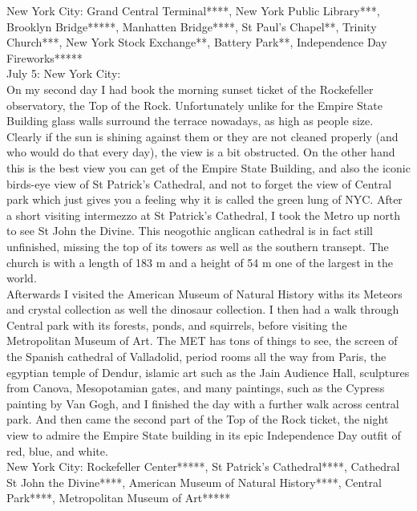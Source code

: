 New York City: Grand Central Terminal****, New York Public Library***, Brooklyn Bridge*****, Manhatten Bridge****, St Paul's Chapel**, Trinity Church***, New York Stock Exchange**, Battery Park**, Independence Day Fireworks*****\\

July 5: New York City:\\
On my second day I had book the morning sunset ticket of the Rockefeller observatory, the Top of the Rock. Unfortunately unlike for the Empire State Building glass walls surround the terrace nowadays, as high as people size. Clearly if the sun is shining against them or they are not cleaned properly (and who would do that every day), the view is a bit obstructed. On the other hand this is the best view you can get of the Empire State Building, and also the iconic birds-eye view of St Patrick's Cathedral, and not to forget the view of Central park which just gives you a feeling why it is called the green lung of NYC. After a short visiting intermezzo at St Patrick's Cathedral, I took the Metro up north to see St John the Divine. This neogothic anglican cathedral is in fact still unfinished, missing the top of its towers as well as the southern transept. The church is with a length of 183 m and a height of 54 m one of the largest in the world.\\
 Afterwards I visited the American Museum of Natural History withs its Meteors and crystal collection as well the dinosaur collection. I then had a walk through Central park with its forests, ponds, and squirrels, before visiting the Metropolitan Museum of Art. The MET has tons of things to see, the screen of the Spanish cathedral of Valladolid, period rooms all the way from Paris, the egyptian temple of Dendur, islamic art such as the Jain Audience Hall, sculptures from Canova, Mesopotamian gates, and many paintings, such as the Cypress painting by Van Gogh, and I finished the day with a further walk across central park. And then came the second part of the Top of the Rock ticket, the night view to admire the Empire State building in its epic Independence Day outfit of red, blue, and white.\\

New York City: Rockefeller Center*****, St Patrick's Cathedral****, Cathedral St John the Divine****, American Museum of Natural History****, Central Park****, Metropolitan Museum of Art*****\\

